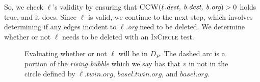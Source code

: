 \documentclass[12pt,twoside]{reedthesis}
\begin{document}
      So, we check $\ell$'s validity by ensuring that $\textsc{CCW}(\textit{$\ell$.dest, b.dest, b.org}) > 0$ holds true, and it does. Since $\ell$ is valid, we continue to the next step, which involves determining if any edges incident to \textit{$\ell$.org} need to be deleted. We determine whether or not $\ell$ needs to be deleted with an \textsc{InCircle} test. 

      \begin{figure}[!htb]
        \ContinuedFloat
        \centering
        \begin{subtable}{\textwidth}
          \centering
          
          \caption{Evaluating whether or not $\ell$ will be in $D_{P}$. The dashed arc is a portion of the \emph{rising bubble} which we say has  that $v$ in not in the circle defined by $\ell.twin.org$, $basel.twin.org$, and $basel.org$.}
          \label{fig:del_knit1}
        \end{subtable}
      \end{figure}



    
\end{document}

